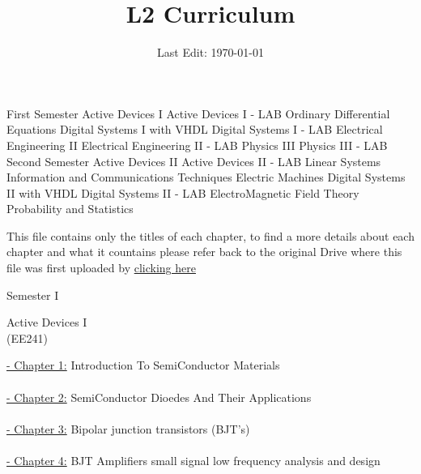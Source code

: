 \documentclass[12pt, a4paper]{article}
\title{\Huge L2 Curriculum}
\date{Last Edit: \today}
\begin{document}
    \maketitle
    \newpage
    \begin{outline}
     \Huge 
       \1 First Semester \Large 
         \2 Active Devices I
         \2 Active Devices I - LAB
         \2 Ordinary Differential Equations
         \2 Digital Systems I with VHDL
         \2 Digital Systems I - LAB
         \2 Electrical Engineering II
         \2 Electrical Engineering II - LAB
         \2 Physics III 
         \2 Physics III - LAB
         \newpage 
     \Huge 
       \1 \Huge Second Semester \Large 
         \2 Active Devices II 
         \2 Active Devices II - LAB
         \2 Linear Systems
         \2 Information and Communications Techniques
         \2 Electric Machines
         \2 Digital Systems II with VHDL
         \2 Digital Systems II - LAB
         \2 ElectroMagnetic Field Theory
         \2 Probability and Statistics
    \end{outline}
    
\newpage
\large This file contains only the titles of each chapter, to find a more details 
about each chapter and what it countains please refer back to the original Drive where
this file was first uploaded by 
\href{https://www.youtube.com/watch?v=dQw4w9WgXcQ}{clicking here}

\newpage
\vspace*{\fill}
\begin{center}
    \Huge Semester I %
\end{center}
\vspace*{\fill}
 
\newpage 
\begin{center}
\Huge 
Active Devices I \\ (EE241)
\end{center}
\normalsize
\large \underline{- Chapter 1:}  Introduction To SemiConductor Materials\\ \\
\large \underline{- Chapter 2:}  SemiConductor Dioedes And Their Applications\\ \\ 
\large \underline{- Chapter 3:}  Bipolar junction transistors (BJT’s)\\ \\ 
\large \underline{- Chapter 4:}  BJT Amplifiers small signal low frequency analysis and design\\ \\
\end{document}
